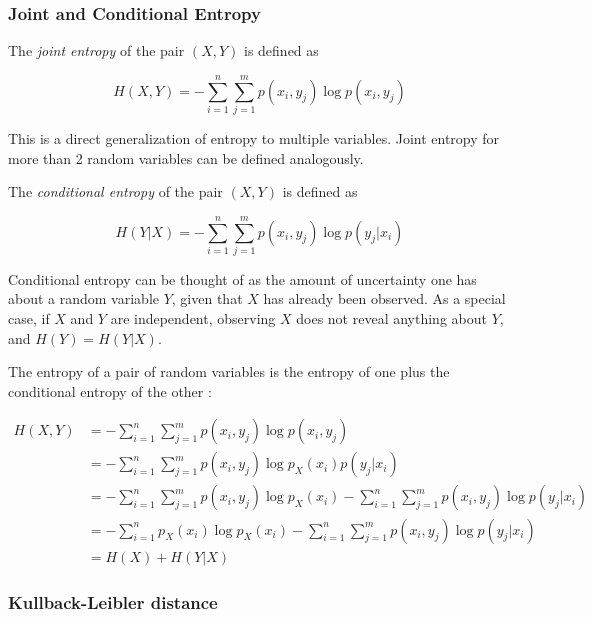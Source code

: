 \documentclass[12pt]{article}
\begin{document}
\subsubsection{Joint and Conditional Entropy}

The \textit{joint entropy} \cite{cover-thomas} of the pair $(X,Y)$ is defined as 

\begin{equation}
H(X,Y) = -\sum_{i=1}^n \sum_{j=1}^m p(x_i,y_j) \log p(x_i,y_j)
\label{eq:cond-etropy}
\end{equation}

This is a direct generalization of entropy to multiple variables. Joint entropy for more than 2 random variables can be defined analogously.

The \textit{conditional entropy} \cite{cover-thomas} of the pair $(X,Y)$ is defined as 

\begin{equation}
H(Y|X) = - \sum_{i=1}^n \sum_{j=1}^m p(x_i,y_j) \log p(y_j|x_i)
\end{equation}

Conditional entropy can be thought of as the amount of uncertainty one has about a random variable $Y$, given that $X$ has already been observed. As a special case, if $X$ and $Y$ are independent, observing $X$ does not reveal anything about $Y$, and $H(Y) = H(Y|X)$.

The entropy of a pair of random variables is the entropy of one plus the conditional entropy of the other \cite{cover-thomas}: 

\begin{align}
H(X,Y) & = -\sum_{i=1}^n \sum_{j=1}^m p(x_i,y_j) \log p(x_i,y_j) \nonumber \\
 	   & = -\sum_{i=1}^n \sum_{j=1}^m p(x_i,y_j) \log p_X(x_i)p(y_j|x_i) \nonumber \\ 
 	   & = -\sum_{i=1}^n \sum_{j=1}^m p(x_i,y_j) \log p_X(x_i) - \sum_{i=1}^n \sum_{j=1}^m p(x_i,y_j) \log p(y_j|x_i) \nonumber \\
 	   & = -\sum_{i=1}^n p_X(x_i) \log p_X(x_i) - \sum_{i=1}^n \sum_{j=1}^m p(x_i,y_j) \log p(y_j|x_i) \nonumber \\ 
 	   & = H(X) + H(Y|X)
\label{eq:chain-rule-entropy}
\end{align}

\subsubsection{Kullback-Leibler distance}
\end{document}
